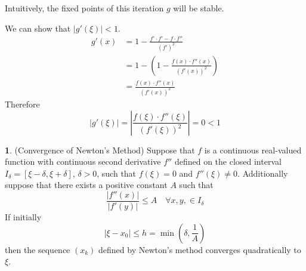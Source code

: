 \documentclass[12pt]{article}
\theoremstyle{definition}
\newtheorem{theorem}{\color{ForestGreen}{\textbf{Theorem}}}
\theoremstyle{definition}
\begin{document}
Intuitively, the fixed points of this iteration $g$ will be stable. 

We can show that $|g'(\xi)| < 1$. 
\begin{align*}
	g'(x) &= 1 - \frac{f'\cdot f' - f\cdot f''}{(f')^2} \\
	&= 1 - \left( 1 - \frac{f(x)\cdot f''(x)}{(f'(x))^2}\right) \\
	&= \frac{f(x)\cdot f''(x)}{(f'(x))^2}
\end{align*}
Therefore
\begin{equation}
	|g'(\xi)| = \left\vert \frac{f(\xi)\cdot f''(\xi)}{(f'(\xi))^2} \right\vert = 0 < 1
\end{equation}

\begin{theorem}(Convergence of Newton's Method)
Suppose that $f$ is a continuous real-valued function with continuous second derivative $f''$ defined on the closed interval $I_\delta = [\xi - \delta, \xi + \delta]$, $\delta > 0$, such that $f(\xi) = 0$ and $f''(\xi) \neq 0$. Additionally suppose that there exists a positive constant $A$ such that 
\begin{equation}
	\frac{|f''(x)|}{|f'(y)|} \leq A \quad \forall x,y, \in I_\delta
\end{equation}
If initially
\begin{equation}
	|\xi - x_0| \leq h = \min(\delta, \frac{1}{A})
\end{equation}
then the sequence $(x_k)$ defined by Newton's method converges quadratically to $\xi$. 
\end{theorem}
\end{document}
